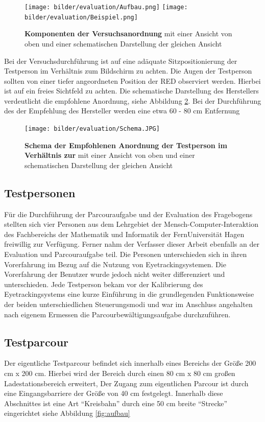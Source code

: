 \begin{figure}[ht]
\begin{center}
\texttt{[image: bilder/evaluation/Aufbau.png]}\hfill
\texttt{[image: bilder/evaluation/Beispiel.png]}
\end{center}
\caption{\textbf{Komponenten der Versuchsanordnung} mit einer Ansicht von oben und einer schematischen Darstellung der gleichen Ansicht}
\label{fig:komponenten}
\end{figure}

Bei der Versuchsdurchführung ist auf eine adäquate Sitzpositionierung der Testperson im Verhältnis zum Bildschirm zu achten. Die Augen der Testperson sollten von einer tiefer angeordneten Position der RED observiert werden. Hierbei ist auf ein freies Sichtfeld zu achten. Die schematische Darstellung des Herstellers verdeutlicht die empfohlene Anordnung, siehe Abbildung \ref{fig:empfehlung}. Bei der Durchführung des der Empfehlung des Hersteller werden eine etwa 60 - 80 cm Entfernung

\begin{figure}[ht]
\begin{center}
\texttt{[image: bilder/evaluation/Schema.JPG]}
\end{center}
\caption{\textbf{Schema der Empfohlenen Anordnung der Testperson im Verhältnis zur } mit einer Ansicht von oben und einer schematischen Darstellung der gleichen Ansicht }
\label{fig:empfehlung}
\end{figure}

\subsection{Testpersonen}
Für die Durchführung der Parcouraufgabe und der Evaluation des Fragebogens stellten sich vier Personen aus dem Lehrgebiet der Mensch-Computer-Interaktion des Fachbereichs der Mathematik und Informatik der FernUniversität Hagen freiwillig zur Verfügung. Ferner nahm der Verfasser dieser Arbeit ebenfalls an der Evaluation und Parcouraufgabe teil. Die Personen unterschieden sich in ihren Vorerfahrung im Bezug auf die Nutzung von Eyetrackingsystemen. Die Vorerfahrung der Benutzer wurde jedoch nicht weiter differenziert und unterschieden. Jede Testperson bekam vor der Kalibrierung des Eyetrackingsystems eine kurze Einführung in die grundlegenden Funktionsweise der beiden unterschiedlichen Steuerungsmodi und war im Anschluss angehalten nach eigenem Ermessen die Parcourbewältigungsaufgabe durchzuführen.

\subsection{Testparcour}
Der eigentliche Testparcour befindet sich innerhalb eines Bereichs der Größe 200 cm x 200 cm. Hierbei wird der Bereich durch einen 80 cm x 80 cm großen Ladestationsbereich erweitert, Der Zugang zum eigentlichen Parcour ist durch eine Eingangsbarriere der Größe von 40 cm festgelegt. Innerhalb diese Abschnittes ist eine Art \enquote{Kreisbahn} durch eine 50 cm breite \enquote{Strecke} eingerichtet siehe Abbildung \ref{fig:aufbau}

